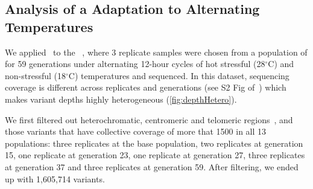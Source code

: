 \subsection{Analysis of a \dmel Adaptation to Alternating 
Temperatures}\label{sec:dmel}
We applied \comale\ to the 
\datadm~\cite{orozco2012adaptation,franssen2015patterns}, where
3 replicate samples were chosen from a population of \dmel for 59
generations under alternating 12-hour cycles of  hot stressful (28$^{\circ}$C)
and non-stressful (18$^{\circ}$C) temperatures and sequenced.  In this dataset,
sequencing coverage is different across replicates and generations
(see S2 Fig of~\cite{Terhorst2015Multi}) which makes variant depths
highly heterogeneous (\ref{fig:depthHetero}). 

We first filtered out heterochromatic, centromeric and telomeric
regions~\cite{fiston2010drosophila}, and those variants that have
collective coverage of more that 1500 in all 13 populations: three
replicates at the base population, two replicates at generation 15,
one replicate at generation 23, one replicate at generation 27, three
replicates at generation 37 and three replicates at generation
59. After filtering, we ended up with 1,605,714 variants.

